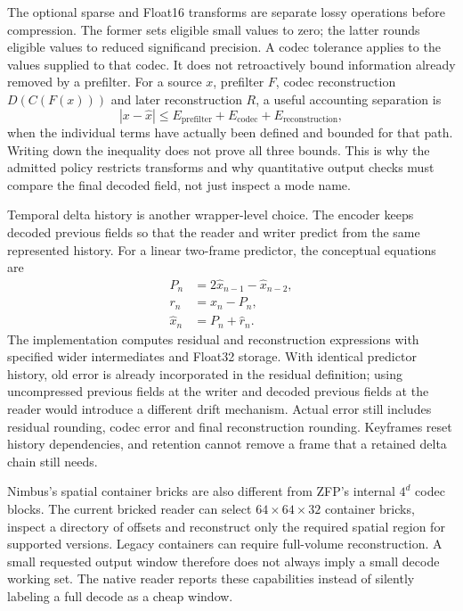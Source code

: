 The optional sparse and Float16 transforms are separate lossy operations before
compression. The former sets eligible small values to zero; the latter rounds
eligible values to reduced significand precision. A codec tolerance applies to
the values supplied to that codec. It does not retroactively bound information
already removed by a prefilter. For a source $x$, prefilter $F$, codec
reconstruction $D(C(F(x)))$ and later reconstruction $R$, a useful accounting
separation is
\[
 |x-\widehat x|
 \leq E_{\mathrm{prefilter}}+E_{\mathrm{codec}}+E_{\mathrm{reconstruction}},
\]
when the individual terms have actually been defined and bounded for that
path. Writing down the inequality does not prove all three bounds. This is why
the admitted policy restricts transforms and why quantitative output checks
must compare the final decoded field, not just inspect a mode name.

Temporal delta history is another wrapper-level choice. The encoder keeps
decoded previous fields so that the reader and writer predict from the same
represented history. For a linear two-frame predictor, the conceptual equations
are
\[
\begin{aligned}
 P_n &= 2\widehat x_{n-1}-\widehat x_{n-2},\\
 r_n &= x_n-P_n,\\
 \widehat x_n &= P_n+\widehat r_n.
\end{aligned}
\]
The implementation computes residual and reconstruction expressions with
specified wider intermediates and Float32 storage. With identical predictor
history, old error is already incorporated in the residual definition; using
uncompressed previous fields at the writer and decoded previous fields at the
reader would introduce a different drift mechanism. Actual error still
includes residual rounding, codec error and final reconstruction rounding.
Keyframes reset history dependencies, and retention cannot remove a frame
that a retained delta chain still needs.

Nimbus's spatial container bricks are also different from ZFP's internal
$4^d$ codec blocks. The current bricked reader can select $64\times64\times32$
container bricks, inspect a directory of offsets and reconstruct only the
required spatial region for supported versions. Legacy containers can require
full-volume reconstruction. A small requested output window therefore does
not always imply a small decode working set. The native reader reports these
capabilities instead of silently labeling a full decode as a cheap window.

